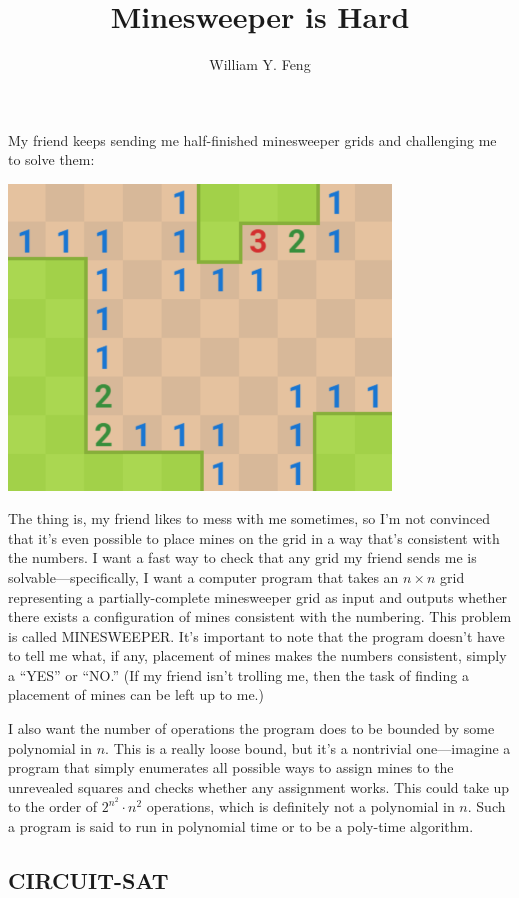 \documentclass{article}
\title{Minesweeper is Hard}
\author{William Y. Feng}
\begin{document}
My friend keeps sending me half-finished minesweeper grids and challenging me to solve them:
\begin{center}
    \includegraphics[width=4in]{images/Minesweeper_fig1.png}
\end{center}

The thing is, my friend likes to mess with me sometimes, so I’m not convinced that it’s even possible to place mines on the grid in a way that’s consistent with the numbers. I want a fast way to check that any grid my friend sends me is solvable---specifically, I want a computer program that takes an $n \times n$ grid representing a partially-complete minesweeper grid as input and outputs whether there exists a configuration of mines consistent with the numbering. This problem is called MINESWEEPER. It’s important to note that the program doesn’t have to tell me what, if any, placement of mines makes the numbers consistent, simply a  “YES” or “NO.” (If my friend isn’t trolling me, then the task of finding a placement of mines can be left up to me.)

I also want the number of operations the program does to be bounded by some polynomial in $n$. This is a really loose bound, but it’s a nontrivial one---imagine a program that simply enumerates all possible ways to assign mines to the unrevealed squares and checks whether any assignment works. This could take up to the order of $2^{n^2} \cdot n^2$ operations, which is definitely not a polynomial in $n$. Such a program is said to run in polynomial time or to be a poly-time algorithm.

\subsection{CIRCUIT-SAT}
\end{document}
